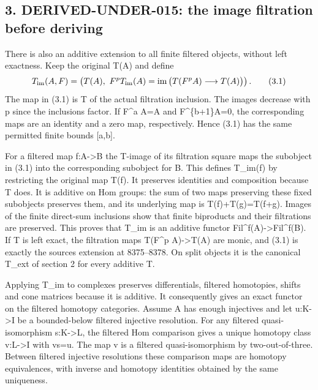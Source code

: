 \documentclass[11pt]{article}
\begin{document}
\subsection{\texorpdfstring{3. DERIVED-UNDER-015:\allowbreak{} the image filtration before deriving}{3.  the image filtration before deriving}}\label{proofs-8352-8772-derived-under-015-the-image-filtration-before-deriving}

There is also an additive extension to all finite filtered objects,\allowbreak{} without left exactness. Keep the original T(A)\allowbreak{} and define \[
 T_{\rm im}(A,F)=
 \left(T(A),\
 F^pT_{\rm im}(A)=
 \operatorname{im}\big(T(F^pA)\longrightarrow T(A)\big)\right).
                                                               \tag{3.1}
\] The map in (3.1)\allowbreak{} is T of the actual filtration inclusion. The images decrease with p since the inclusions factor. If F\^{}a A\allowbreak{}=A and F\textasciicircum{}\{b\allowbreak{}+1\}A\allowbreak{}=0,\allowbreak{} the corresponding maps are an identity and a zero map,\allowbreak{} respectively. Hence (3.1)\allowbreak{} has the same permitted finite bounds [a,\allowbreak{}b]\allowbreak{}.

For a filtered map f:\allowbreak{}A\allowbreak{}->B the T-image of its filtration square maps the subobject in (3.1)\allowbreak{} into the corresponding subobject for B. This defines T\_\allowbreak{}im(f)\allowbreak{} by restricting the original map T(f)\allowbreak{}. It preserves identities and composition because T does. It is additive on Hom groups:\allowbreak{} the sum of two maps preserving these fixed subobjects preserves them,\allowbreak{} and its underlying map is T(f)\allowbreak{}\allowbreak{}+T(g)\allowbreak{}\allowbreak{}=T(f\allowbreak{}+g)\allowbreak{}. Images of the finite direct-sum inclusions show that finite biproducts and their filtrations are preserved. This proves that T\_\allowbreak{}im is an additive functor Fil\textasciicircum{}f(A)\allowbreak{}\allowbreak{}->Fil\textasciicircum{}f(B)\allowbreak{}. If T is left exact,\allowbreak{} the filtration maps T(F\^{}p A)\allowbreak{}\allowbreak{}->T(A)\allowbreak{} are monic,\allowbreak{} and (3.1)\allowbreak{} is exactly the source\textquotesingle s extension at 8375–\allowbreak{}8378. On split objects it is the canonical T\_\allowbreak{}ext of section 2 for every additive T.

Applying T\_\allowbreak{}im to complexes preserves differentials,\allowbreak{} filtered homotopies,\allowbreak{} shifts and cone matrices because it is additive. It consequently gives an exact functor on the filtered homotopy categories. Assume A has enough injectives and let u:\allowbreak{}K\allowbreak{}->I be a bounded-below filtered injective resolution. For any filtered quasi-isomorphism s:\allowbreak{}K\allowbreak{}->L,\allowbreak{} the filtered Hom comparison gives a unique homotopy class v:\allowbreak{}L\allowbreak{}->I with vs\allowbreak{}=u. The map v is a filtered quasi-isomorphism by two-out-of-three. Between filtered injective resolutions these comparison maps are homotopy equivalences,\allowbreak{} with inverse and homotopy identities obtained by the same uniqueness.
\end{document}
